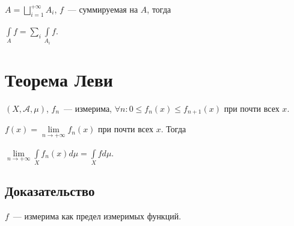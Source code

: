 \documentclass{article}
\begin{document}
            $A = \bigsqcup\limits_{i = 1}^{+\infty} A_i$, $f$~--- суммируемая на $A$, тогда 
        
            $\int\limits_{A} f = \sum\limits_{i} \int\limits_{A_i} f$.

\newpage

    \section{Теорема Леви}
    
        $(X, \mathcal{A}, \mu)$, $f_n$~--- измерима, $\forall n : 0 \leqslant f_n(x) \leqslant f_{n + 1} (x)$ при почти всех $x$.
        
        $f(x) = \lim\limits_{n \rightarrow +\infty} f_n(x)$ при почти всех $x$. Тогда
        
        $\lim\limits_{n \rightarrow +\infty} \int\limits_{X} f_n(x) d \mu = \int\limits_{X} f d \mu$.
        
        \subsection{Доказательство}
        
            $f$~--- измерима как предел измеримых функций.
            
\end{document}
